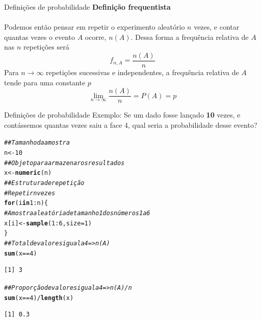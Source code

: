 \documentclass[10pt]{beamer}\usepackage[]{graphicx}\usepackage[]{color}
\makeatletter
\newcommand{\hlnum}[1]{\textcolor[rgb]{0.686,0.059,0.569}{#1}}%
\newcommand{\hlcom}[1]{\textcolor[rgb]{0.678,0.584,0.686}{\textit{#1}}}%
\newcommand{\hlopt}[1]{\textcolor[rgb]{0,0,0}{#1}}%
\newcommand{\hlstd}[1]{\textcolor[rgb]{0.345,0.345,0.345}{#1}}%
\newcommand{\hlkwa}[1]{\textcolor[rgb]{0.161,0.373,0.58}{\textbf{#1}}}%
\newcommand{\hlkwb}[1]{\textcolor[rgb]{0.69,0.353,0.396}{#1}}%
\newcommand{\hlkwc}[1]{\textcolor[rgb]{0.333,0.667,0.333}{#1}}%
\newcommand{\hlkwd}[1]{\textcolor[rgb]{0.737,0.353,0.396}{\textbf{#1}}}%
\newenvironment{kframe}{%
 \def\at@end@of@kframe{}%
 \ifinner\ifhmode%
  \def\at@end@of@kframe{\end{minipage}}%
  \begin{minipage}{\columnwidth}%
 \fi\fi%
 \def\FrameCommand##1{\hskip\@totalleftmargin \hskip-\fboxsep
 \colorbox{shadecolor}{##1}\hskip-\fboxsep
     \hskip-\linewidth \hskip-\@totalleftmargin \hskip\columnwidth}%
 \MakeFramed {\advance\hsize-\width
   \@totalleftmargin\z@ \linewidth\hsize
   \@setminipage}}%
 {\par\unskip\endMakeFramed%
 \at@end@of@kframe}
\newenvironment{knitrout}{}{} %
\theoremstyle{definition}
\makeatother
\begin{document}
\begin{frame}{Definições de probabilidade}
  \textbf{Definição frequentista}\\~\\
  Podemos então pensar em repetir o experimento aleatório $n$ vezes, e
  contar quantas vezes o evento $A$ ocorre, $n(A)$. Dessa forma a
  frequência relativa de $A$ nas $n$ repetições será
  \begin{equation*}
    f_{n,A} = \frac{n(A)}{n}
  \end{equation*}
  Para $n \rightarrow \infty$ repetições sucessivas e independentes, a
  frequência relativa de $A$ tende para uma constante $p$
  \begin{equation*}
    \lim_{n \rightarrow \infty} \frac{n(A)}{n} = P(A) = p
  \end{equation*}
\end{frame}

\begin{frame}[fragile]{Definições de probabilidade}
  Exemplo: Se um dado fosse lançado \textbf{10} vezes, e contássemos
  quantas vezes saiu a face 4, qual seria a probabilidade desse evento?
\begin{knitrout}\footnotesize
{}\color{fgcolor}\begin{kframe}
\begin{alltt}
\hlcom{## Tamanho da amostra}
\hlstd{n} \hlkwb{<-} \hlnum{10}
\hlcom{## Objeto para armazenar os resultados}
\hlstd{x} \hlkwb{<-} \hlkwd{numeric}\hlstd{(n)}
\hlcom{## Estrutura de repetição}
\hlcom{# Repetir n vezes}
\hlkwa{for}\hlstd{(i} \hlkwa{in} \hlnum{1}\hlopt{:}\hlstd{n)\{}
    \hlcom{# Amostra aleatória de tamanho 1 dos números 1 a 6}
    \hlstd{x[i]} \hlkwb{<-} \hlkwd{sample}\hlstd{(}\hlnum{1}\hlopt{:}\hlnum{6}\hlstd{,} \hlkwc{size} \hlstd{=} \hlnum{1}\hlstd{)}
\hlstd{\}}
\hlcom{## Total de valores igual a 4 => n(A)}
\hlkwd{sum}\hlstd{(x} \hlopt{==} \hlnum{4}\hlstd{)}
\end{alltt}
\begin{verbatim}
[1] 3
\end{verbatim}
\begin{alltt}
\hlcom{## Proporção de valores igual a 4 => n(A)/n}
\hlkwd{sum}\hlstd{(x} \hlopt{==} \hlnum{4}\hlstd{)}\hlopt{/}\hlkwd{length}\hlstd{(x)}
\end{alltt}
\begin{verbatim}
[1] 0.3
\end{verbatim}
\end{kframe}
\end{knitrout}
\end{frame}
\end{document}
